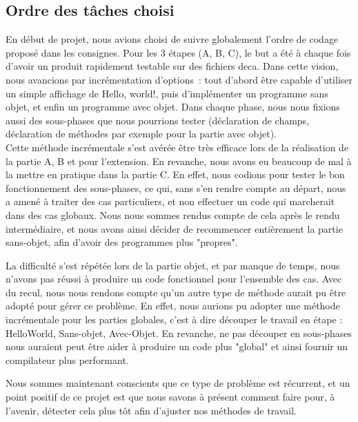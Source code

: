 \documentclass{article}
\begin{document}
\subsection{Ordre des tâches choisi}
En début de projet, nous avions choisi de suivre globalement l’ordre de codage proposé dans les consignes.
Pour les 3 étapes (A, B, C), le but a été à chaque fois d’avoir un produit rapidement testable sur des fichiers deca. Dans cette vision, nous avancions par incrémentation d’options :
tout d’abord être capable d’utiliser un simple affichage de Hello, world!, puis d’implémenter un programme sans objet, et enfin un programme avec objet. \newline
Dans chaque phase, nous nous fixions aussi des sous-phases que nous pourrions tester (déclaration de champs, déclaration de méthodes par exemple pour la partie avec objet). \newline
\\
Cette méthode incrémentale s'est avérée être très efficace lors de la réalisation de la partie A, B et pour l'extension. En revanche,
nous avons eu beaucoup de mal à la mettre en pratique dans la partie C. En effet, nous codions pour tester le bon fonctionnement des sous-phases, ce qui, sans s'en rendre compte au départ, nous a amené à traiter des cas particuliers,
et non effectuer un code qui marcherait dans des cas globaux. Nous nous sommes rendus compte de cela après le rendu intermédiaire, et nous
avons ainsi décider de recommencer entièrement la partie sans-objet, afin d'avoir des programmes plus "propres". \newline

La difficulté s'est répétée lors de la partie objet, et par manque de temps, nous n'avons pas réussi à produire un code fonctionnel pour l'ensemble des cas. \newline
Avec du recul, nous nous rendons compte qu'un autre type de méthode aurait pu être adopté pour gérer ce problème. En effet, nous
aurions pu adopter une méthode incrémentale pour les parties globales, c'est à dire découper le travail en étape : HelloWorld, Sans-objet, Avec-Objet.
En revanche, ne pas découper en sous-phases nous auraient peut être aider à produire un code plus "global" et ainsi fournir un compilateur plus performant. \newline

Nous sommes maintenant conscients que ce type de problème est récurrent, et un point positif de ce projet est que nous savons à présent comment faire pour, à l'avenir, détecter cela plus tôt afin d'ajuster nos méthodes de travail.
\newpage
\end{document}
